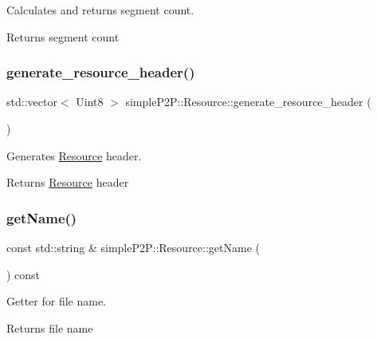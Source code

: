 Calculates and returns segment count. 

\begin{DoxyReturn}{Returns}
segment count 
\end{DoxyReturn}
\mbox{\label{classsimpleP2P_1_1Resource_a87e735b9e7b48c329698c6e7aab455a8}} 
\subsubsection{\texorpdfstring{generate\+\_\+resource\+\_\+header()}{generate\_resource\_header()}}
{\footnotesize\ttfamily std\+::vector$<$ Uint8 $>$ simple\+P2\+P\+::\+Resource\+::generate\+\_\+resource\+\_\+header (\begin{DoxyParamCaption}{ }\end{DoxyParamCaption})}



Generates \hyperlink{classsimpleP2P_1_1Resource}{Resource} header. 

\begin{DoxyReturn}{Returns}
\hyperlink{classsimpleP2P_1_1Resource}{Resource} header 
\end{DoxyReturn}
\mbox{\label{classsimpleP2P_1_1Resource_adc12496aedf1729852d2c98bf94428aa}} 
\subsubsection{\texorpdfstring{get\+Name()}{getName()}}
{\footnotesize\ttfamily const std\+::string \& simple\+P2\+P\+::\+Resource\+::get\+Name (\begin{DoxyParamCaption}{ }\end{DoxyParamCaption}) const}



Getter for file name. 

\begin{DoxyReturn}{Returns}
file name 
\end{DoxyReturn}
\mbox{\label{classsimpleP2P_1_1Resource_a866cdd2e717abf3515629ca73b2f80b8}} 
